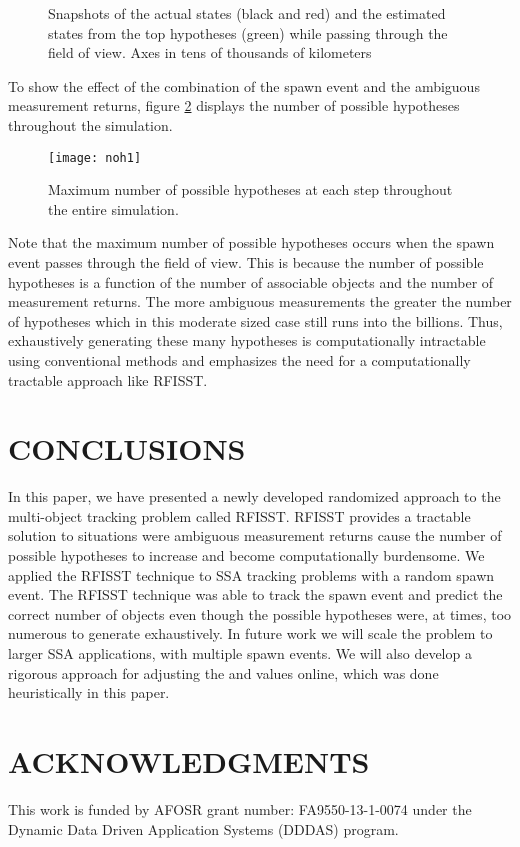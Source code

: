 \documentclass[10pt, conference]{IEEEtran}
\begin{document}
\begin{figure}[H]
\centering
{}


\caption{Snapshots of the actual states (black and red) and the estimated states from the top hypotheses (green) while passing through the field of view. Axes in tens of thousands of kilometers}
\label{20Spawn}
\end{figure}

To show the effect of the combination of the spawn event and the ambiguous measurement returns, figure \ref{NHs}
displays the number of possible hypotheses throughout the simulation. 

\begin{figure}[H]
\centering
\texttt{[image: noh1]}
\caption{Maximum number of possible hypotheses at each step throughout the entire simulation.}
\label{NHs}
\end{figure}
Note that the maximum number of possible hypotheses occurs when the spawn event passes through the field of view. This is because the number of possible hypotheses is a function of the number of associable objects and the number of measurement returns. The more ambiguous measurements the greater the number of hypotheses which in this moderate sized case still runs into the billions. Thus, exhaustively generating these many hypotheses is computationally intractable using conventional methods and emphasizes the need for a computationally tractable approach like RFISST. 









\section{CONCLUSIONS}
In this paper, we have presented a newly developed randomized approach to the multi-object tracking problem called RFISST. RFISST provides a tractable solution to situations were ambiguous measurement returns cause the number of possible hypotheses to increase and become computationally burdensome. We applied the RFISST technique to SSA tracking problems with a random spawn event. The RFISST technique was able to track the spawn event and predict the correct number of objects even though the possible hypotheses were, at times, too numerous to generate exhaustively. In future work we will scale the problem to larger SSA applications, with multiple spawn events.  We will also develop a rigorous approach for adjusting the  and  values online, which was done heuristically in this paper. 
\section{ACKNOWLEDGMENTS}
\label{.7}
This work is funded by AFOSR grant number: FA9550-13-1-0074 under the Dynamic Data Driven Application Systems (DDDAS) program.











\end{document}
